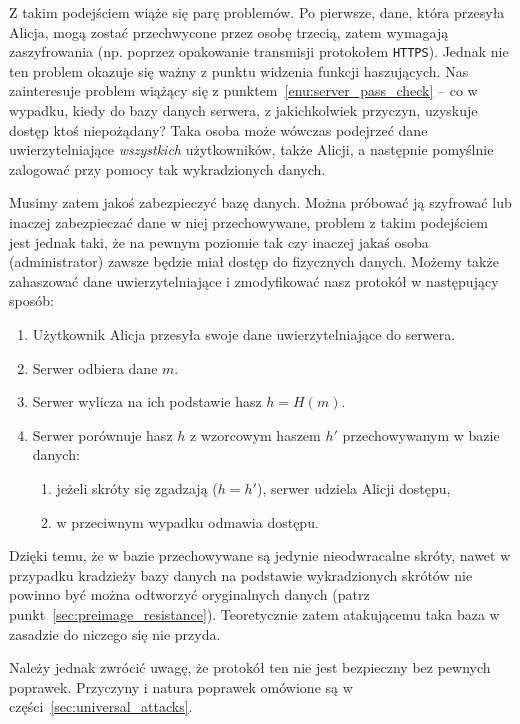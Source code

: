 \documentclass[12pt,a4paper,twoside]{article}
\begin{document}
Z takim podejściem wiąże się parę problemów. Po pierwsze, dane, która przesyła
Alicja, mogą zostać przechwycone przez osobę trzecią, zatem wymagają
zaszyfrowania (np. poprzez opakowanie transmisji protokołem \texttt{HTTPS}).
Jednak nie ten problem okazuje się ważny z punktu widzenia funkcji haszujących.
Nas zainteresuje problem wiążący się z punktem~\ref{enu:server_pass_check} --
co w wypadku, kiedy do bazy danych serwera, z jakichkolwiek przyczyn, uzyskuje
dostęp ktoś niepożądany? Taka osoba może wówczas podejrzeć dane
uwierzytelniające \emph{wszystkich} użytkowników, także Alicji, a następnie
pomyślnie zalogować przy pomocy tak wykradzionych danych.

Musimy zatem jakoś zabezpieczyć bazę danych. Można próbować ją szyfrować lub
inaczej zabezpieczać dane w niej przechowywane, problem z takim podejściem jest
jednak taki, że na pewnym poziomie tak czy inaczej jakaś osoba (administrator)
zawsze będzie miał dostęp do fizycznych danych. Możemy także zahaszować dane
uwierzytelniające i zmodyfikować nasz protokół w następujący sposób:

\begin{enumerate}
\item Użytkownik Alicja przesyła swoje dane uwierzytelniające do serwera.
\item Serwer odbiera dane $m$.
\item Serwer wylicza na ich podstawie hasz $h = H(m)$.
\item Serwer porównuje hasz $h$ z wzorcowym haszem $h'$ przechowywanym w bazie
danych:
    \begin{enumerate}[label*=\arabic*.]
    \item jeżeli skróty się zgadzają ($h = h'$), serwer udziela Alicji dostępu,
    \item w przeciwnym wypadku odmawia dostępu.
    \end{enumerate}
\end{enumerate}

Dzięki temu, że w bazie przechowywane są jedynie nieodwracalne skróty, nawet w
przypadku kradzieży bazy danych na podstawie wykradzionych skrótów nie powinno
być można odtworzyć oryginalnych danych (patrz
punkt~\ref{sec:preimage_resistance}). Teoretycznie zatem atakującemu taka baza
w zasadzie do niczego się nie przyda.

Należy jednak zwrócić uwagę, że protokół ten nie jest bezpieczny bez pewnych
poprawek. Przyczyny i natura poprawek omówione są w
części~\ref{sec:universal_attacks}.
\end{document}
